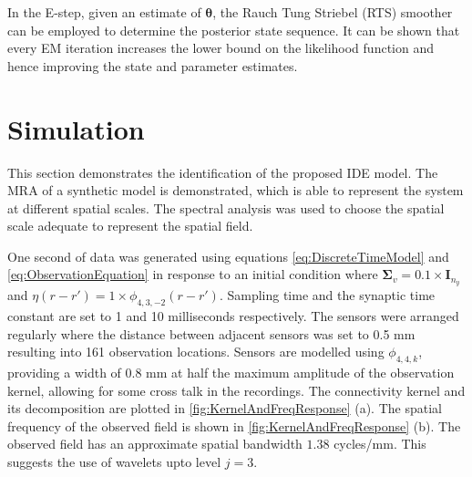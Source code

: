 \documentclass[journal,a4paper]{IEEEtran}
\begin{document}

In the E-step, given an estimate of $\boldsymbol\theta$, the Rauch Tung Striebel (RTS) smoother can be employed to determine the posterior state sequence. It can be shown that \cite{Dempster1977,Gibsona2005} every EM iteration increases the lower bound on the likelihood function and hence improving the state and parameter estimates.
\section{Simulation}
This section demonstrates the identification of the proposed IDE model. The MRA of a synthetic model is demonstrated, which is able to represent the system at different spatial scales. The spectral analysis was used to choose the spatial scale adequate to represent the spatial field.

One second of data was generated using equations \eqref{eq:DiscreteTimeModel} and \eqref{eq:ObservationEquation} in response to an initial condition where $\boldsymbol\Sigma_v=0.1 \times \mathbf{I}_{n_y}$ and $ \eta(r-r')=1\times\phi_{4,3,-2}(r-r')$. Sampling time and the synaptic time constant are set to 1 and 10 milliseconds respectively. The sensors were arranged regularly where the distance between adjacent sensors was set to 0.5 mm resulting into 161 observation locations. Sensors are modelled using $\phi_{4,4,k}$, providing a width of 0.8 mm at half the maximum amplitude of the observation kernel, allowing for some cross talk in the recordings. The connectivity kernel and its decomposition are plotted in  \figurename{\ref{fig:KernelAndFreqResponse}} (a). The spatial frequency of the observed field is shown in \figurename{\ref{fig:KernelAndFreqResponse}} (b). The observed field has an approximate spatial bandwidth $1.38$ cycles/mm. This suggests the use of wavelets upto level $j=3$. 
\end{document}
